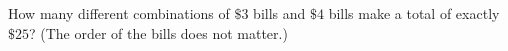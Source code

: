 How many different combinations of $\$3$ bills and $\$4$ bills make a total of exactly $\$25$? (The order of the bills does not matter.)
